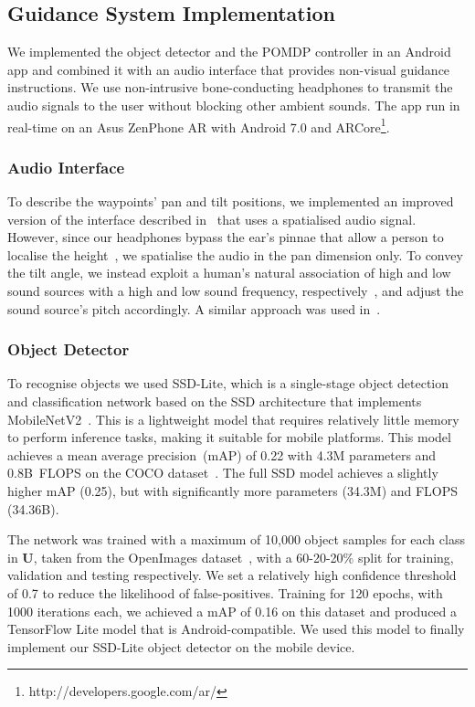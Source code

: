\documentclass[runningheads]{llncs}
\begin{document}
\subsection{Guidance System Implementation}

We implemented the object detector and the POMDP controller in an Android app and combined it with an audio interface that provides non-visual guidance instructions.
We use non-intrusive bone-conducting headphones to transmit the audio signals to the user without blocking other ambient sounds.
The app run in real-time on an Asus ZenPhone AR with Android 7.0 and ARCore\footnote{http://developers.google.com/ar/}.%

\subsubsection{Audio Interface}
To describe the waypoints' pan and tilt positions, we implemented an improved version of the interface described in~\cite{bellotto2013} that uses a spatialised audio signal.
However, since our headphones bypass the ear's pinnae that allow a person to localise the height~\cite{roffler1968factors}, we spatialise the audio in the pan dimension only.
To convey the tilt angle, we instead exploit a human's natural association of high and low sound sources with a high and low sound frequency, respectively~\cite{blauert1997spatial}, and adjust the sound source's pitch accordingly. 
A similar approach was used in~\cite{schauerte2012assistive}.

\subsubsection{Object Detector}
To recognise objects we used SSD-Lite, which is a single-stage object detection and classification network based on the SSD architecture that implements MobileNetV2~\cite{sandler2018mobilenetv2}.
This is a lightweight model that requires relatively little memory to perform inference tasks, making it suitable for mobile platforms. 
This model achieves a mean average precision~(mAP) of 0.22 with 4.3M parameters and 0.8B~FLOPS on the COCO dataset~\cite{li2018tinydsod}.
The full SSD model achieves a slightly higher mAP (0.25), but with significantly more parameters (34.3M) and FLOPS (34.36B).

The network was trained with a maximum of 10,000 object samples for each class in $\mathbf{U}$, taken from the OpenImages dataset~\cite{openimages}, with a 60-20-20\% split for training, validation and testing respectively.
We set a relatively high confidence threshold of 0.7 to reduce the likelihood of false-positives.
Training for 120 epochs, with 1000 iterations each, we achieved a mAP of 0.16 on this dataset and produced a TensorFlow Lite model that is Android-compatible. We used this model to finally implement our SSD-Lite object detector on the mobile device.
\end{document}
